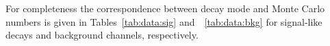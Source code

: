 For completeness the correspondence between decay mode and Monte Carlo numbers
is given in Tables~\ref{tab:data:sig} and~~\ref{tab:data:bkg} for signal-like decays
and background channels, respectively.

